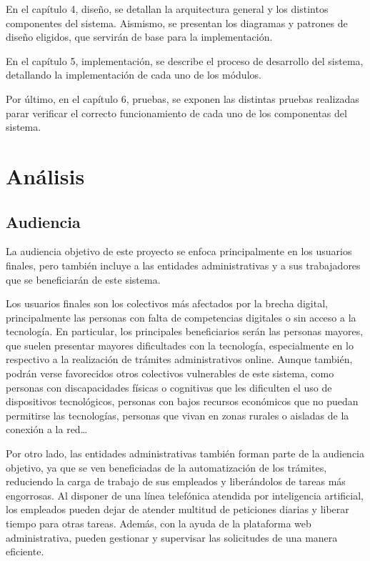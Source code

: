 \documentclass[12pt, a4paper, twoside]{report}
\begin{document}
        En el capítulo 4, diseño, se detallan la arquitectura general y los distintos componentes del sistema. 
        Aismismo, se presentan los diagramas y patrones de diseño eligidos, que servirán de base para la implementación.

        En el capítulo 5, implementación, se describe el proceso de desarrollo del sistema, detallando la implementación de cada uno de los módulos.

        Por último, en el capítulo 6, pruebas, se exponen las distintas pruebas realizadas parar verificar el correcto funcionamiento de cada uno de los componentas del sistema.

        
\chapter{Análisis}

    \section{Audiencia}
        La audiencia objetivo de este proyecto se enfoca principalmente en los usuarios finales, pero también incluye a las entidades administrativas y a sus trabajadores que se beneficiarán de este sistema.

        Los usuarios finales son los colectivos más afectados por la brecha digital, principalmente las personas con falta de competencias digitales o sin acceso a la tecnología.
        En particular, los principales beneficiarios serán las personas mayores, que suelen presentar mayores dificultades con la tecnología, especialmente en lo respectivo a la realización de trámites administrativos online.
        Aunque también, podrán verse favorecidos otros colectivos vulnerables de este sistema, como personas con discapacidades físicas o cognitivas que les dificulten el uso de dispositivos tecnológicos, personas con bajos recursos económicos que no puedan permitirse las tecnologías, personas que vivan en zonas rurales o aisladas de la conexión a la red\dots
        
        Por otro lado, las entidades administrativas también forman parte de la audiencia objetivo, ya que se ven beneficiadas de la automatización de los trámites, reduciendo la carga de trabajo de sus empleados y liberándolos de tareas más engorrosas. 
        Al disponer de una línea telefónica atendida por inteligencia artificial, los empleados pueden dejar de atender multitud de peticiones diarias y liberar tiempo para otras tareas. Además, con la ayuda de la plataforma web administrativa, pueden gestionar y supervisar las solicitudes de una manera eficiente.
        
\end{document}
